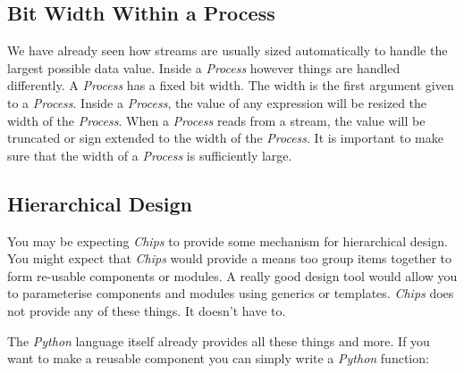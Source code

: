 \documentclass[letterpaper,10pt,english]{sphinxmanual}
\begin{document}
\subsection{Bit Width Within a Process}
\label{tutorial/index:bit-width-within-a-process}
We have already seen how streams are usually sized automatically to handle the
largest possible data value. Inside a \emph{Process} however things are handled
differently. A \emph{Process} has a fixed bit width. The width is the first argument
given to a \emph{Process}. Inside a \emph{Process}, the value of any expression will be
resized the width of the \emph{Process}. When a \emph{Process} reads from a stream, the
value will be truncated or sign extended to the width of the \emph{Process}. It is
important to make sure that the width of a \emph{Process} is sufficiently large.


\subsection{Hierarchical Design}
\label{tutorial/index:hierarchical-design}
You may be expecting \emph{Chips} to provide some mechanism for hierarchical design.
You might expect that \emph{Chips} would provide a means too group items together to
form re-usable components or modules. A really good design tool would allow you
to parameterise components and modules using generics or templates. \emph{Chips} does
not provide any of these things. It doesn't have to.

The \emph{Python} language itself already provides all these things and more. If you
want to make a reusable component you can simply write a \emph{Python} function:
\end{document}
